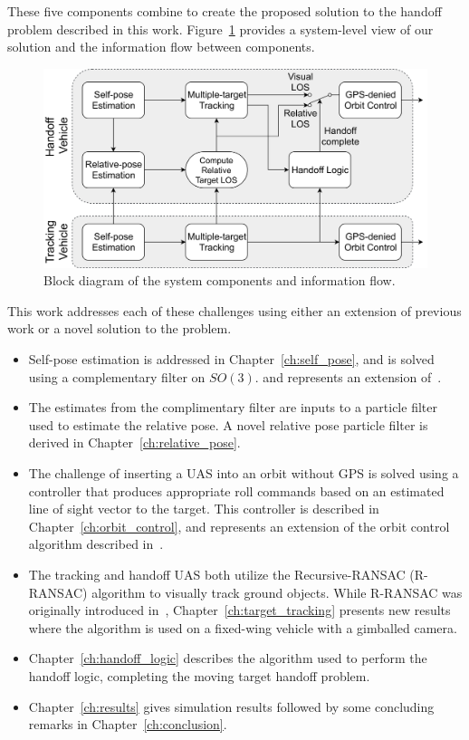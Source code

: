 These five components combine to create the proposed solution to the handoff problem described in this work. Figure~\ref{fig:handoff_block} provides a system-level view of our solution and the information flow between components.

\begin{figure}[hbt]
    \centering
    \includegraphics[width=1.0\textwidth]{figures/intro/handoff_block}
    \caption{Block diagram of the system components and information flow.}
    \label{fig:handoff_block}
\end{figure}


This work addresses each of these challenges using either an extension of previous work or a novel solution to the problem. 
\begin{itemize}
  \item Self-pose estimation is addressed in Chapter~\ref{ch:self_pose}, and is solved using a complementary filter on $SO(3)$. and represents an extension of~\cite{Mahony11}.
  \item The estimates from the complimentary filter are inputs to a particle filter used to estimate the relative pose. A novel relative pose particle filter is derived in Chapter~\ref{ch:relative_pose}.
  \item The challenge of inserting a UAS into an orbit without GPS is solved using a controller that produces appropriate roll commands based on an estimated line of sight vector to the target. This controller is described in Chapter~\ref{ch:orbit_control}, and represents an extension of the orbit control algorithm described in~\cite{BeardMcLain12}.  
  \item The tracking and handoff UAS both utilize the Recursive-RANSAC (R-RANSAC) algorithm to visually track ground objects. While R-RANSAC was originally introduced in~\cite{NiedfeldtBeard14}, Chapter~\ref{ch:target_tracking} presents new results where the algorithm is used on a fixed-wing vehicle with a gimballed camera.
  \item Chapter~\ref{ch:handoff_logic} describes the algorithm used to perform the handoff logic, completing the moving target handoff problem.
  \item Chapter~\ref{ch:results} gives simulation results followed by some concluding remarks in Chapter~\ref{ch:conclusion}.
\end{itemize}
